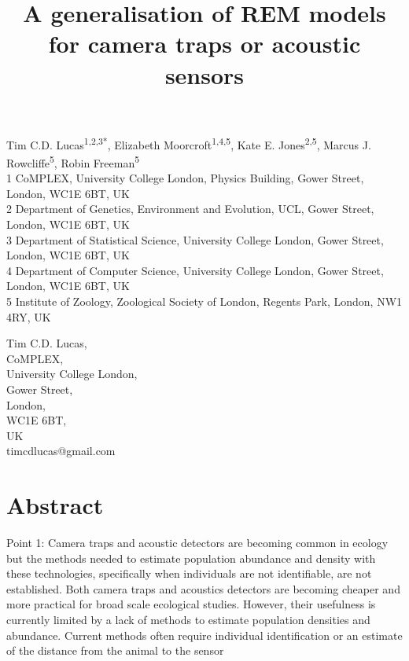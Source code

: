 \documentclass[a4paper,10pt,reqno,oneside]{amsart}
\begin{document}
\title{A generalisation of REM models for camera traps or acoustic sensors}
\maketitle



Tim C.D. Lucas\textsuperscript{1,2,3*}, Elizabeth Moorcroft\textsuperscript{1,4,5}, Kate E. Jones\textsuperscript{2,5}, Marcus J. Rowcliffe\textsuperscript{5}, Robin Freeman\textsuperscript{5}\\


1 CoMPLEX, University College London, Physics Building, Gower Street, London, WC1E 6BT, UK\\ 
2 Department of Genetics, Environment and Evolution, UCL, Gower Street, London, WC1E 6BT, UK\\ 
3 Department of Statistical Science, University College London, Gower Street, London, WC1E 6BT, UK\\ 
4 Department of Computer Science, University College London, Gower Street, London, WC1E 6BT, UK\\ 
5 Institute of Zoology, Zoological Society of London, Regents Park, London, NW1 4RY, UK


Tim C.D. Lucas,\\
CoMPLEX,\\
University College London,\\
Gower Street,\\
London,\\
WC1E 6BT, \\
UK\\
timcdlucas@gmail.com\\


\clearpage



\section{Abstract}
Point 1: Camera traps and acoustic detectors are becoming common in ecology but the methods needed to estimate population abundance and density with these technologies, specifically when individuals are not identifiable, are not established. Both camera traps and acoustics detectors are becoming cheaper and more practical for broad scale ecological studies. However, their usefulness is currently limited by a lack of methods to estimate population densities and abundance. Current methods often require individual identification or an estimate of the distance from the animal to the sensor
\end{document}
